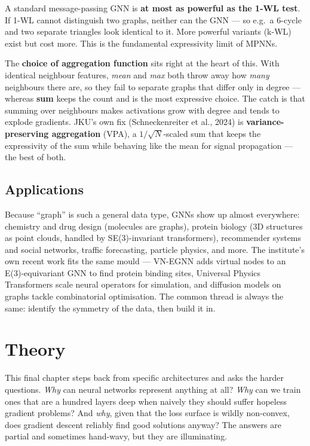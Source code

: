 \documentclass[11pt, oneside]{book}
\begin{document}
\begin{notebox}[title={The expressivity ceiling}]
A standard message-passing GNN is \textbf{at most as powerful as the 1-WL test}.
If 1-WL cannot distinguish two graphs, neither can the GNN --- so e.g.\ a 6-cycle
and two separate triangles look identical to it. More powerful variants (k-WL)
exist but cost more. This is the fundamental expressivity limit of MPNNs.
\end{notebox}

The \textbf{choice of aggregation function} sits right at the heart of this. With
identical neighbour features, \emph{mean} and \emph{max} both throw away how
\emph{many} neighbours there are, so they fail to separate graphs that differ only
in degree --- whereas \textbf{sum} keeps the count and is the most expressive
choice. The catch is that summing over neighbours makes activations grow with
degree and tends to explode gradients. JKU's own fix (Schneckenreiter et al.,
2024) is \textbf{variance-preserving aggregation} (VPA), a $1/\sqrt{N}$-scaled sum
that keeps the expressivity of the sum while behaving like the mean for signal
propagation --- the best of both.

\section{Applications}

Because ``graph'' is such a general data type, GNNs show up almost everywhere:
chemistry and drug design (molecules are graphs), protein biology (3D structures
as point clouds, handled by SE(3)-invariant transformers), recommender systems and
social networks, traffic forecasting, particle physics, and more. The institute's
own recent work fits the same mould --- VN-EGNN adds virtual nodes to an
E(3)-equivariant GNN to find protein binding sites, Universal Physics Transformers
scale neural operators for simulation, and diffusion models on graphs tackle
combinatorial optimisation. The common thread is always the same: identify the
symmetry of the data, then build it in.


\chapter{Theory}

This final chapter steps back from specific architectures and asks the harder
questions. \emph{Why} can neural networks represent anything at all? \emph{Why}
can we train ones that are a hundred layers deep when naively they should suffer
hopeless gradient problems? And \emph{why}, given that the loss surface is wildly
non-convex, does gradient descent reliably find good solutions anyway? The answers
are partial and sometimes hand-wavy, but they are illuminating.
\end{document}
